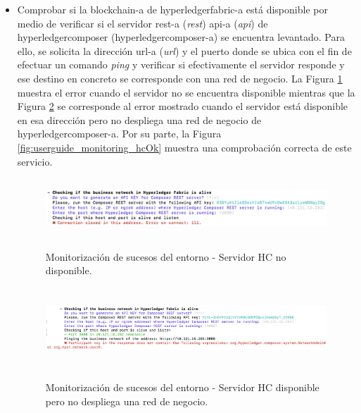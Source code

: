 \documentclass[12pt,a4paper, twoside]{report}
\begin{document}
\begin{itemize}
	 	\item Comprobar si la \gls{blockchain-a} de \gls{hyperledgerfabric-a} está disponible por medio de verificar si el servidor \gls{rest-a} (\textit{\gls{rest}}) \gls{api-a} (\textit{\gls{api}}) de \gls{hyperledgercomposer} (\gls{hyperledgercomposer-a}) se encuentra levantado. Para ello, se solicita la dirección \gls{url-a} (\textit{\gls{url}}) y el puerto donde se ubica con el fin de efectuar un comando \textit{ping} y verificar si efectivamente el servidor responde y ese destino en concreto se corresponde con una red de negocio. La Figura \ref{fig:userguide_monitoring_hcError} muestra el error cuando el servidor no se encuentra disponible mientras que la Figura \ref{fig:userguide_monitoring_hcBusiness} se corresponde al error mostrado cuando el servidor está disponible en esa dirección pero no despliega una red de negocio de \gls{hyperledgercomposer-a}. Por su parte, la Figura \ref{fig:userguide_monitoring_hcOk} muestra una comprobación correcta de este servicio. \\
	 	 
	 		 \begin{figure}[!ht]   
				\caption{Monitorización de sucesos del entorno - Servidor HC no disponible.} 
				\begin{center} 
					\includegraphics[width=16cm,height=2.2cm]{Images/userGuide/monitoring/hcError} \\
					\label{fig:userguide_monitoring_hcError} 
				\end{center}  
			\end{figure}	 
					
			 \begin{figure}[!ht]   
				\caption{Monitorización de sucesos del entorno - Servidor HC disponible pero no despliega una red de negocio.} 
				\begin{center} 
					\includegraphics[width=16cm,height=3cm]{Images/userGuide/monitoring/hcBusiness} \\
					\label{fig:userguide_monitoring_hcBusiness} 
				\end{center}  
			\end{figure}	 
			

\end{itemize}
\end{document}
